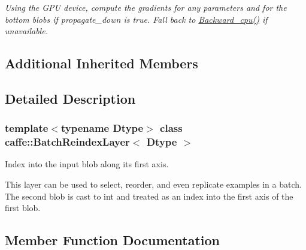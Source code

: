 \begin{DoxyCompactItemize}
\begin{DoxyCompactList}\small\item\em Using the G\+PU device, compute the gradients for any parameters and for the bottom blobs if propagate\+\_\+down is true. Fall back to \mbox{\hyperlink{classcaffe_1_1_batch_reindex_layer_a8306bf8f4c49c33fc2a7cecbb436e5dc}{Backward\+\_\+cpu()}} if unavailable. \end{DoxyCompactList}\end{DoxyCompactItemize}
\subsection*{Additional Inherited Members}


\subsection{Detailed Description}
\subsubsection*{template$<$typename Dtype$>$\newline
class caffe\+::\+Batch\+Reindex\+Layer$<$ Dtype $>$}

Index into the input blob along its first axis. 

This layer can be used to select, reorder, and even replicate examples in a batch. The second blob is cast to int and treated as an index into the first axis of the first blob. 

\subsection{Member Function Documentation}
\mbox{\label{classcaffe_1_1_batch_reindex_layer_a8306bf8f4c49c33fc2a7cecbb436e5dc}} 
